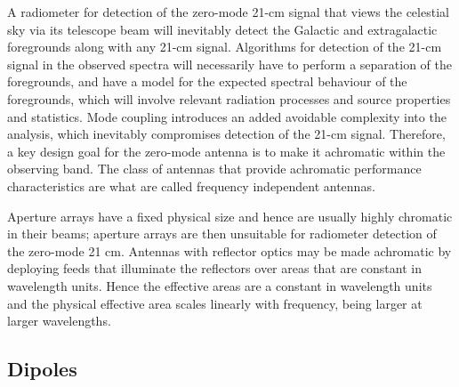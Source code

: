    A radiometer for detection of the zero-mode 21-cm signal that views the celestial sky via its telescope beam will inevitably detect the Galactic and extragalactic foregrounds along with any 21-cm signal.  Algorithms for detection of the 21-cm signal in the observed spectra will necessarily have to perform a separation of the foregrounds, and have a model for the expected spectral behaviour of the foregrounds, which will involve relevant radiation processes and source properties and statistics.  Mode coupling introduces an added avoidable complexity into the analysis, which inevitably compromises detection of the 21-cm signal.  Therefore, a key design goal for the zero-mode antenna is to make it achromatic within the observing band.  The class of antennas that provide achromatic performance characteristics are what are called frequency independent antennas.
   
   Aperture arrays have a fixed physical size and hence are usually highly chromatic in their beams; aperture arrays are then unsuitable for radiometer detection of the zero-mode 21 cm.  Antennas with reflector optics may be made achromatic by deploying feeds that illuminate the reflectors over areas that are constant in wavelength units. Hence the effective areas are a constant in wavelength units and the physical effective area scales linearly with frequency, being larger at larger wavelengths.
   
   \subsection{Dipoles}
   
